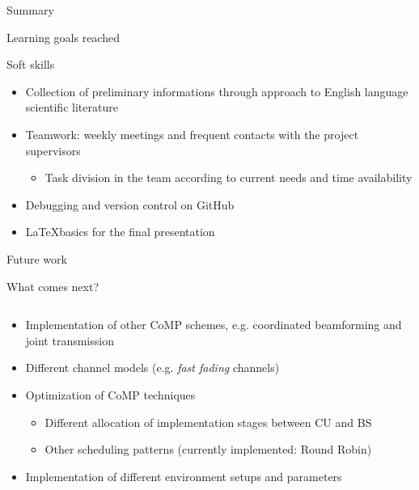 \documentclass[xcolor={cmyk}]{beamer}
\begin{document}
\begin{frame}{Summary}
	 \begin{block}{Learning goals reached}
    	\hspace*{.1\linewidth}\begin{minipage}{.8\linewidth}
    		\begin{block}{Soft skills}
      			\begin{itemize}
      				\item Collection of preliminary informations through approach to English language scientific literature
      				\item Teamwork: weekly meetings and frequent contacts with the project supervisors
      				\begin{itemize}
      					\item Task division in the team according to current needs and time availability
      				\end{itemize}
      				\item Debugging and version control on GitHub
      				\item \LaTeX basics for the final presentation
      			\end{itemize}
    		\end{block}
    	\end{minipage}
	 \end{block}	 
 \end{frame}

 \begin{frame}{Future work}
	 \begin{block}{What comes next?}
	 	\begin{columns}
			\begin{column}{.9\textwidth}
				\begin{itemize}
					\item Implementation of other CoMP schemes, e.g. coordinated beamforming and joint transmission
					\item Different channel models (e.g. \textit{fast fading} channels)
					\item Optimization of CoMP techniques
					\begin{itemize}
						\item Different allocation of implementation stages between CU and BS
						\item Other scheduling patterns (currently implemented: Round Robin)
					\end{itemize}
					\item Implementation of different environment setups and parameters
				\end{itemize}
			\end{column}
		\end{columns}
	 \end{block}
 \end{frame}
\end{document}
